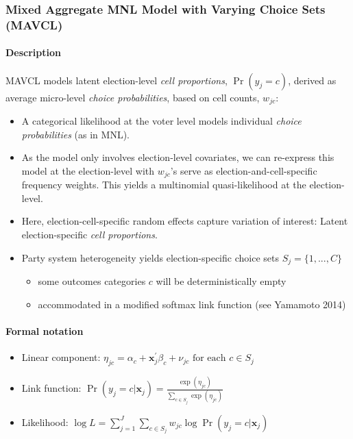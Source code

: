\documentclass[
  11pt,
]{article}
\providecommand{\tightlist}{%
  \setlength{\itemsep}{0pt}\setlength{\parskip}{0pt}}
\begin{document}
\hypertarget{mixed-aggregate-mnl-model-with-varying-choice-sets-mavcl}{%
\subsubsection{Mixed Aggregate MNL Model with Varying Choice Sets (MAVCL)}\label{mixed-aggregate-mnl-model-with-varying-choice-sets-mavcl}}

\hypertarget{description}{%
\paragraph{Description}\label{description}}

MAVCL models latent election-level \emph{cell proportions}, \(\Pr(y_{j} = c)\), derived as average micro-level \emph{choice probabilities}, based on cell counts, \(w_{jc}\):

\begin{itemize}
\tightlist
\item
  A categorical likelihood at the voter level models individual \emph{choice probabilities} (as in MNL).
\item
  As the model only involves election-level covariates, we can re-express this model at the election-level with \(w_{jc}\)'s serve as election-and-cell-specific frequency weights. This yields a multinomial quasi-likelihood at the election-level.
\item
  Here, election-cell-specific random effects capture variation of interest: Latent election-specific \emph{cell proportions}.
\item
  Party system heterogeneity yields election-specific choice sets \(S_j = \{1,...,C\}\)

  \begin{itemize}
  \tightlist
  \item
    some outcomes categories \(c\) will be deterministically empty
  \item
    accommodated in a modified softmax link function (see Yamamoto 2014)
  \end{itemize}
\end{itemize}

\hypertarget{formal-notation}{%
\paragraph{Formal notation}\label{formal-notation}}

\begin{itemize}
\tightlist
\item
  Linear component: \(\eta_{jc} = \alpha_c + \mathbf{x}_j^{\prime} \beta_c + \nu_{jc} \text{  for each  } c \in S_{j}\)
\item
  Link function: \(\Pr(y_{j} = c | \mathbf{x}_j) = \frac{\exp(\eta_{jc})}{\sum_{c \in S_{j}} \exp(\eta_{jc})}\)
\item
  Likelihood: \(\log L = \sum_{j=1}^{J} \sum_{c \in S_{j}} w_{jc} \log \Pr(y_{j} = c | \mathbf{x}_j)\)
\end{itemize}
\end{document}
